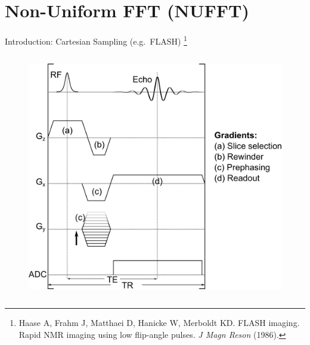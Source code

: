\section{Non-Uniform FFT (NUFFT)}

\begin{frame}{Introduction: Cartesian Sampling (e.g.~FLASH) \footnote{Haase A, Frahm J, Matthaei D, Hanicke W, Merboldt KD. FLASH imaging. Rapid NMR imaging using low flip-angle pulses. \textit{J Magn Reson} (1986).}}

	\begin{columns}
		\begin{column}{0.45\textwidth}
			\begin{figure}
				\includegraphics[width=\columnwidth]{fig/mri-seq-ge-cart.png}
			\end{figure}
		\end{column}


\end{columns}
\end{frame}
